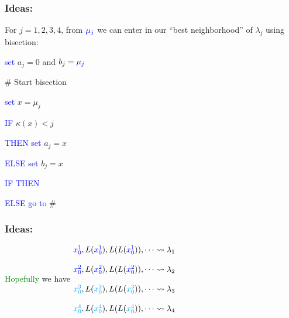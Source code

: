 \documentclass{beamer}
\theoremstyle{definition} \newtheorem{de}{Def}
\theoremstyle{remark} \newtheorem{os}[de]{Oss}
\theoremstyle{plain} \newtheorem{te}[de]{Teo}
\theoremstyle{plain} \newtheorem{co}[de]{Cor}
\theoremstyle{plain} \newtheorem{pr}[de]{Prop}
\theoremstyle{plain} \newtheorem{lem}[de]{Lemm}
\theoremstyle{remark} \newtheorem{rem}[de]{Remark}
\begin{document}
\begin{frame}
  \frametitle{Ideas:}

For $j=1,2,3,4$, from $\textcolor{blue}{\mu_j}$ we can enter in our ``best neighborhood'' of $\lambda_j$ using bisection:

\pause


\begin{Bitemize}[t]
\item \textcolor{blue}{set} $a_j=0$ and $b_j=\textcolor{blue}{\mu_j}$ 
\item \# Start bisection
\item \textcolor{blue}{set} $x=\mu_j$
\item \textcolor{blue}{IF} $\kappa(x)<j$ 
\item \textcolor{blue}{THEN} \textcolor{blue}{set} $a_j=x$ 
\item \textcolor{blue}{ELSE} \textcolor{blue}{set} $b_j=x$
\item \textcolor{blue}{IF} \textcolor{blue}{THEN} 
\item \textcolor{blue}{ELSE} \textcolor{blue}{go to} \# 
\end{Bitemize}



\end{frame}



\begin{frame}

\frametitle{Ideas:}

\textcolor{green}{Hopefully} we have 
$\begin{matrix}
  \textcolor{blue}{x_{0}^{1}}, L(\textcolor{blue}{x_{0}^{1}}), L(L(\textcolor{blue}{x_{0}^{1}})),\dots \leadsto \lambda_1 \\
  \\
  \textcolor{blue}{x_{0}^{2}}, L(\textcolor{blue}{x_{0}^{2}}), L(L(\textcolor{blue}{x_{0}^{2}})),\dots \leadsto \lambda_2 \\
  \\
  \textcolor{cyan}{x_{0}^{3}}, L(\textcolor{cyan}{x_{0}^{3}}), L(L(\textcolor{cyan}{x_{0}^{3}})),\dots \leadsto \lambda_3 \\
  \\
  \textcolor{cyan}{x_{0}^{4}}, L(\textcolor{cyan}{x_{0}^{4}}), L(L(\textcolor{cyan}{x_{0}^{4}})),\dots \leadsto \lambda_4
\end{matrix}$ 

\end{frame}
\end{document}
